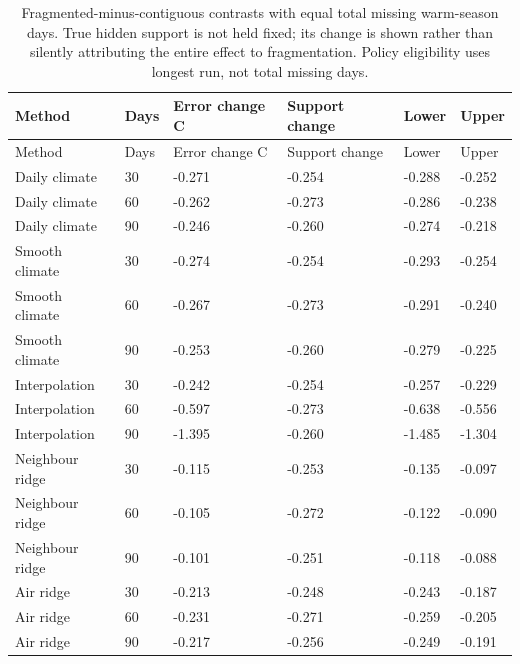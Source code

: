 {\tabletext
\setlength{\tabcolsep}{3pt}
\begin{longtable}{p{}p{}p{}p{}p{}p{}}
\caption{Fragmented-minus-contiguous contrasts with equal total missing warm-season days. True hidden support is not held fixed; its change is shown rather than silently attributing the entire effect to fragmentation. Policy eligibility uses longest run, not total missing days.}\label{tab:r3si-fragmentation}\\
\toprule
Method & Days & Error change C & Support change & Lower & Upper \\
\midrule
\endfirsthead
\toprule
Method & Days & Error change C & Support change & Lower & Upper \\
\midrule
\endhead
Daily climate & 30 & -0.271 & -0.254 & -0.288 & -0.252 \\
Daily climate & 60 & -0.262 & -0.273 & -0.286 & -0.238 \\
Daily climate & 90 & -0.246 & -0.260 & -0.274 & -0.218 \\
Smooth climate & 30 & -0.274 & -0.254 & -0.293 & -0.254 \\
Smooth climate & 60 & -0.267 & -0.273 & -0.291 & -0.240 \\
Smooth climate & 90 & -0.253 & -0.260 & -0.279 & -0.225 \\
Interpolation & 30 & -0.242 & -0.254 & -0.257 & -0.229 \\
Interpolation & 60 & -0.597 & -0.273 & -0.638 & -0.556 \\
Interpolation & 90 & -1.395 & -0.260 & -1.485 & -1.304 \\
Neighbour ridge & 30 & -0.115 & -0.253 & -0.135 & -0.097 \\
Neighbour ridge & 60 & -0.105 & -0.272 & -0.122 & -0.090 \\
Neighbour ridge & 90 & -0.101 & -0.251 & -0.118 & -0.088 \\
Air ridge & 30 & -0.213 & -0.248 & -0.243 & -0.187 \\
Air ridge & 60 & -0.231 & -0.271 & -0.259 & -0.205 \\
Air ridge & 90 & -0.217 & -0.256 & -0.249 & -0.191 \\
\bottomrule
\end{longtable}
}

